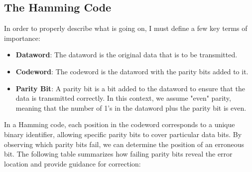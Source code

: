 \documentclass[12pt]{article}
\begin{document}
\subsection*{The Hamming Code}
In order to properly describe what is going on, I must define a few key terms of importance:
\begin{itemize}
	\item \textbf{Dataword}: The dataword is the original data that is to be transmitted.
	\item \textbf{Codeword}: The codeword is the dataword with the parity bits added to it.
	\item \textbf{Parity Bit}: A parity bit is a bit added to the dataword to ensure that the data is transmitted correctly. In this context, we assume "even" parity, meaning that the number of 1's in the dataword plus the parity bit is even.
\end{itemize}

In a Hamming code, each position in the codeword corresponds to a unique binary identifier, allowing specific parity bits to cover particular data bits. By observing which parity bits fail, we can determine the position of an erroneous bit. The following table summarizes how failing parity bits reveal the error location and provide guidance for correction:
\end{document}
